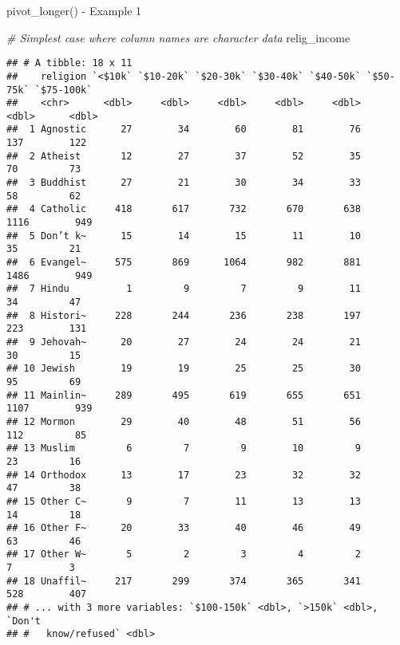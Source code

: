 \documentclass[
  ignorenonframetext,
]{beamer}
\newenvironment{Shaded}{\begin{snugshade}}{\end{snugshade}}
\newcommand{\CommentTok}[1]{\textcolor[rgb]{0.56,0.35,0.01}{\textit{#1}}}
\newcommand{\NormalTok}[1]{#1}
\begin{document}
\begin{frame}[fragile]{pivot\_longer() - Example 1}
\protect\hypertarget{pivot_longer---example-1}{}

\begin{Shaded}
\begin{Highlighting}[]
\CommentTok{# Simplest case where column names are character data}
\NormalTok{relig_income}
\end{Highlighting}
\end{Shaded}

\begin{verbatim}
## # A tibble: 18 x 11
##    religion `<$10k` `$10-20k` `$20-30k` `$30-40k` `$40-50k` `$50-75k` `$75-100k`
##    <chr>      <dbl>     <dbl>     <dbl>     <dbl>     <dbl>     <dbl>      <dbl>
##  1 Agnostic      27        34        60        81        76       137        122
##  2 Atheist       12        27        37        52        35        70         73
##  3 Buddhist      27        21        30        34        33        58         62
##  4 Catholic     418       617       732       670       638      1116        949
##  5 Don’t k~      15        14        15        11        10        35         21
##  6 Evangel~     575       869      1064       982       881      1486        949
##  7 Hindu          1         9         7         9        11        34         47
##  8 Histori~     228       244       236       238       197       223        131
##  9 Jehovah~      20        27        24        24        21        30         15
## 10 Jewish        19        19        25        25        30        95         69
## 11 Mainlin~     289       495       619       655       651      1107        939
## 12 Mormon        29        40        48        51        56       112         85
## 13 Muslim         6         7         9        10         9        23         16
## 14 Orthodox      13        17        23        32        32        47         38
## 15 Other C~       9         7        11        13        13        14         18
## 16 Other F~      20        33        40        46        49        63         46
## 17 Other W~       5         2         3         4         2         7          3
## 18 Unaffil~     217       299       374       365       341       528        407
## # ... with 3 more variables: `$100-150k` <dbl>, `>150k` <dbl>, `Don't
## #   know/refused` <dbl>
\end{verbatim}

\end{frame}
\end{document}
